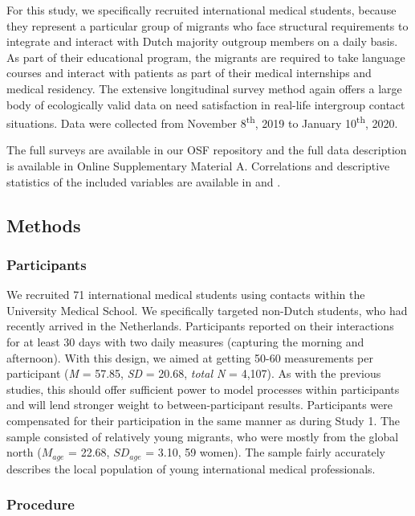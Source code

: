 For this study, we specifically recruited international medical
students, because they represent a particular group of migrants who face
structural requirements to integrate and interact with Dutch majority
outgroup members on a daily basis. As part of their educational program,
the migrants are required to take language courses and interact with
patients as part of their medical internships and medical residency. The
extensive longitudinal survey method again offers a large body of
ecologically valid data on need satisfaction in real-life intergroup
contact situations. Data were collected from November
8\textsuperscript{th}, 2019 to January 10\textsuperscript{th}, 2020.

The full surveys are available in our OSF repository
\citep{KreienkampMasked2022a} and the full data description is available
in Online Supplementary Material A. Correlations and descriptive
statistics of the included variables are available in
 and .

\subsection{Methods}

\subsubsection{Participants}

We recruited 71 international medical students using contacts within the
University Medical School. We specifically targeted non-Dutch students,
who had recently arrived in the Netherlands. Participants reported on
their interactions for at least 30 days with two daily measures
(capturing the morning and afternoon). With this design, we aimed at
getting 50-60 measurements per participant (\textit{M} = 57.85,
\textit{SD} = 20.68, \textit{total N} = 4,107). As with the previous
studies, this should offer sufficient power to model processes within
participants and will lend stronger weight to between-participant
results. Participants were compensated for their participation in the
same manner as during Study 1. The sample consisted of relatively young
migrants, who were mostly from the global north (\(M_{age}\) = 22.68,
\(SD_{age}\) = 3.10, 59 women). The sample fairly accurately describes
the local population of young international medical professionals.

\subsubsection{Procedure}

